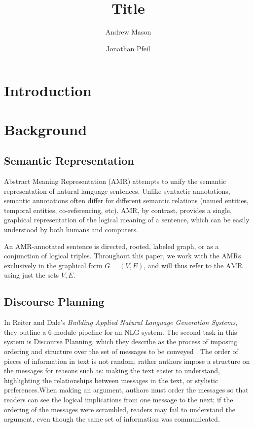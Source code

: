 \documentclass[12pt]{article}
\title{Title}
\author{Andrew Mason \and Jonathan Pfeil}
\begin{document}
\maketitle
\tableofcontents
\listoffigures
\listofalgorithms
\listoftables
\pagebreak

\section{Introduction}
\section{Background}
\subsection{Semantic Representation}

Abstract Meaning Representation (AMR)\cite{amr_sembank} attempts to unify the
semantic representation of natural language sentences. Unlike syntactic
annotations, semantic annotations often differ for different semantic relations
(named entities, temporal entities, co-referencing, etc). AMR, by contrast,
provides a single, graphical representation of the logical meaning of a
sentence, which can be easily understood by both humans and computers.

An AMR-annotated sentence is directed, rooted, labeled graph, or as a
conjunction of logical triples. Throughout this paper, we work with the AMRs
exclusively in the graphical form $G=(V,E)$, and will thus refer to the AMR
using just the sets $V,E$.

\subsection{Discourse Planning}

In Reiter and Dale's {\em Building Applied Natural Language Generation Systems}, they outline a 6-module pipeline for an NLG system. The second task in this system is Discourse Planning, which they describe as the process of imposing ordering and structure over the set of messages to be conveyed \cite{applied_nlg}. The order of pieces of information in text is not random; rather authors impose a structure on the messages for reasons such as: making the text easier to understand, highlighting the relationships between messages in the text, or stylistic preferences.When making an argument, authors must order the messages so that readers can see the logical implications from one message to the next; if the ordering of the messages were scrambled, readers may fail to understand the argument, even though the same set of information was communicated.
\end{document}
